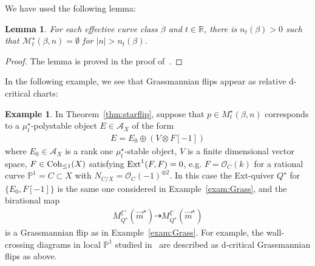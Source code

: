 \documentclass[11pt]{amsart}
\theoremstyle{plain}
\newtheorem{lem}[thm]{Lemma}
\theoremstyle{definition}
\newtheorem{exam}[thm]{Example}
\theoremstyle{remark}
\newcommand{\aA}{\mathcal{A}}
\newcommand{\mM}{\mathcal{M}}
\newcommand{\oO}{\mathcal{O}}
\newcommand{\Ext}{\mathop{\rm Ext}\nolimits}
\newcommand{\Coh}{\mathop{\rm Coh}\nolimits}
\begin{document}
We have used the following lemma: 
\begin{lem}\label{lem:boundn}
For each effective curve class $\beta$
and $t \in \mathbb{R}$, there is 
$n_t(\beta) >0$ such that 
$\mM_t^{\star}(\beta, n) = \emptyset$ 
for $\lvert n \rvert >  n_t(\beta)$. 
\end{lem} 
\begin{proof}
The lemma is proved in the proof of~\cite[Lemma~4.4]{Tolim2}. 
\end{proof}

In the following example, we see
that Grassmannian flips
appear as relative d-critical charts: 
\begin{exam}\label{exam:Gflip}
In Theorem~\ref{thm:starflip}, suppose that 
$p \in M_t^{\star}(\beta, n)$ corresponds to a 
$\mu_t^{\star}$-polystable object $E \in \aA_X$ of the form
\begin{align*}
E=E_0 \oplus (V \otimes F[-1])
\end{align*}
where 
$E_0 \in \aA_X$ is a rank one $\mu_t^{\star}$-stable object, 
$V$ is a finite dimensional 
vector space, $F \in \Coh_{\le 1}(X)$
satisfying $\Ext^1(F, F)=0$, e.g. 
$F=\oO_C(k)$ for a rational 
curve $\mathbb{P}^1=C \subset X$
with $N_{C/X}=\oO_{C}(-1)^{\oplus 2}$. 
In this case the Ext-quiver 
$Q^{\star}$ 
for $\{E_0, F[-1]\}$
is the same one considered in 
Example~\ref{exam:Grass}, 
and the birational map 
\begin{align*}
M_{Q^{\star}}^{\xi^{+}}(\vec{m}^{\star}) \dashrightarrow 
M_{Q^{\star}}^{\xi^-}(\vec{m}^{\star})
\end{align*}
 is a 
Grassmannian flip
as in Example~\ref{exam:Grass}. 
For example,
the wall-crossing diagrams 
in local $\mathbb{P}^1$
studied 
in~\cite{NN} are described as d-critical 
Grassmannian flips
as above. 
\end{exam}
\end{document}
